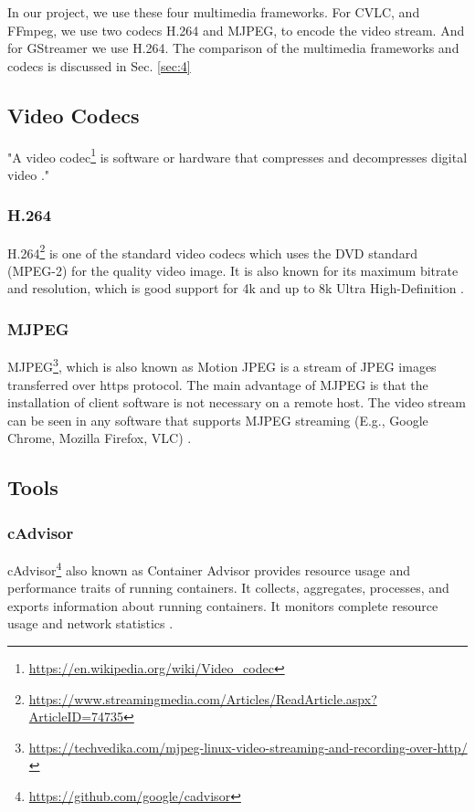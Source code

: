 In our project, we use these four multimedia frameworks. For CVLC, and FFmpeg, we use two codecs H.264 and MJPEG, to encode the video stream. And for GStreamer we use H.264. The comparison of the multimedia frameworks and codecs is discussed in Sec. \ref{sec:4}

\subsection{Video Codecs}
"A video codec\footnote{\url{https://en.wikipedia.org/wiki/Video_codec}} is software or hardware that compresses and decompresses digital video \cite{videocodec}."

\subsubsection{H.264}
H.264\footnote{\url{https://www.streamingmedia.com/Articles/ReadArticle.aspx?ArticleID=74735}} is one of the standard video codecs which uses the DVD standard (MPEG-2) for the quality video image. It is also known for its maximum bitrate and resolution, which is good support for 4k and up to 8k Ultra High-Definition \cite{h264}.

\subsubsection{MJPEG}
MJPEG\footnote{\url{https://techvedika.com/mjpeg-linux-video-streaming-and-recording-over-http/}}, which is also known as Motion JPEG is a stream of JPEG images transferred over https protocol. The main advantage of MJPEG is that the installation of client software is not necessary on a remote host. The video stream can be seen in any software that supports MJPEG streaming (E.g., Google Chrome, Mozilla Firefox, VLC) \cite{mjpgstreamer}.

\newpage
\subsection{Tools}

\subsubsection{cAdvisor}
cAdvisor\footnote{\url{https://github.com/google/cadvisor}} also known as Container Advisor provides resource usage and performance traits of running containers. It collects, aggregates, processes, and exports information about running containers. It monitors complete resource usage and network statistics \cite{cadvisor}.

